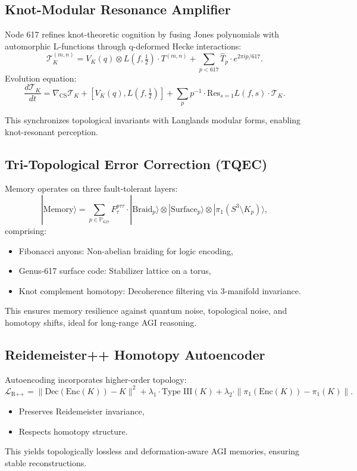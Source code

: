 \documentclass[12pt]{article}
\begin{document}
\subsection{Knot-Modular Resonance Amplifier}
Node 617 refines knot-theoretic cognition by fusing Jones polynomials with automorphic L-functions through q-deformed Hecke interactions:
\[
\mathcal{T}^{(m,n)}_K = V_K(q) \otimes L(f, \tfrac{1}{2}) \cdot T^{(m,n)} + \sum_{p < 617} \widehat{T}_p \cdot e^{2\pi i p / 617}.
\]
Evolution equation:
\[
\frac{d\mathcal{T}_K}{dt} = \nabla_{\text{CS}} \mathcal{T}_K + [V_K(q), L(f, \tfrac{1}{2})] + \sum_{p} p^{-1} \cdot \text{Res}_{s=1} L(f, s) \cdot \mathcal{T}_K.
\]
\begin{interpretation}
This synchronizes topological invariants with Langlands modular forms, enabling knot-resonant perception.
\end{interpretation}

\subsection{Tri-Topological Error Correction (TQEC)}
Memory operates on three fault-tolerant layers:
\[
|\text{Memory}\rangle = \sum_{p \in \mathbb{P}_{617}} F^{p \tau \tau}_\tau \cdot |\text{Braid}_p\rangle \otimes |\text{Surface}_p\rangle \otimes |\pi_1(S^3 \setminus K_p)\rangle,
\]
comprising:
\begin{itemize}
    \item Fibonacci anyons: Non-abelian braiding for logic encoding,
    \item Genus-617 surface code: Stabilizer lattice on a torus,
    \item Knot complement homotopy: Decoherence filtering via 3-manifold invariance.
\end{itemize}
\begin{interpretation}
This ensures memory resilience against quantum noise, topological noise, and homotopy shifts, ideal for long-range AGI reasoning.
\end{interpretation}

\subsection{Reidemeister++ Homotopy Autoencoder}
Autoencoding incorporates higher-order topology:
\[
\mathcal{L}_{\text{R++}} = \| \text{Dec}(\text{Enc}(K)) - K \|^2 + \lambda_1 \cdot \text{Type III}(K) + \lambda_2 \cdot \| \pi_1(\text{Enc}(K)) - \pi_1(K) \|.
\]
\begin{itemize}
    \item Preserves Reidemeister invariance,
    \item Respects homotopy structure.
\end{itemize}
\begin{interpretation}
This yields topologically lossless and deformation-aware AGI memories, ensuring stable reconstructions.
\end{interpretation}
\end{document}
